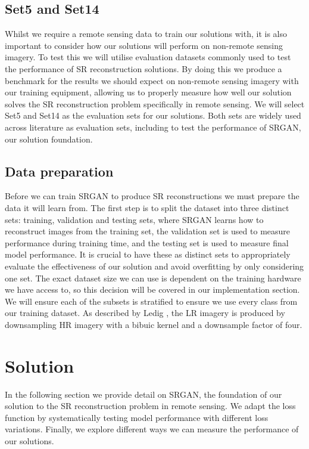 \subsection{Set5 and Set14}
Whilst we require a remote sensing data to train our solutions with, it is also important to consider how our solutions will perform on non-remote sensing imagery. To test this we will utilise evaluation datasets commonly used to test the performance of SR reconstruction solutions. By doing this we produce a benchmark for the results we should expect on non-remote sensing imagery with our training equipment, allowing us to properly measure how well our solution solves the SR reconstruction problem specifically in remote sensing. We will select Set5 and Set14 as the evaluation sets for our solutions. Both sets are widely used across literature as evaluation sets, including to test the performance of SRGAN, our solution foundation.

\subsection{Data preparation}\label{subsec:data_preparation}
Before we can train SRGAN to produce SR reconstructions we must prepare the data it will learn from. The first step is to split the dataset into three distinct sets: training, validation and testing sets, where SRGAN learns how to reconstruct images from the training set, the validation set is used to measure performance during training time, and the testing set is used to measure final model performance. It is crucial to have these as distinct sets to appropriately evaluate the effectiveness of our solution and avoid overfitting by only considering one set. The exact dataset size we can use is dependent on the training hardware we have access to, so this decision will be covered in our implementation section. We will ensure each of the subsets is stratified to ensure we use every class from our training dataset. As described by Ledig \etal, the LR imagery is produced by downsampling HR imagery with a bibuic kernel and a downsample factor of four.

\section{Solution}
In the following section we provide detail on SRGAN, the foundation of our solution to the SR reconstruction problem in remote sensing. We adapt the loss function by systematically testing model performance with different loss variations. Finally, we explore different ways we can measure the performance of our solutions.

